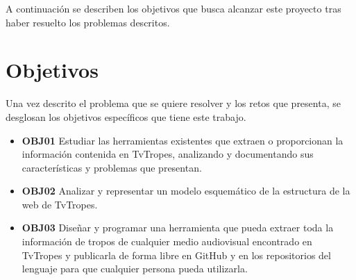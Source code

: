 A continuación se describen los objetivos que busca alcanzar este proyecto tras
haber resuelto los problemas descritos.

\section{Objetivos}

Una vez descrito el problema que se quiere resolver y los retos que presenta, se
desglosan los objetivos específicos que tiene este trabajo.

\begin{itemize}
    \item \textbf{OBJ01} Estudiar las herramientas existentes que extraen o
    proporcionan la información contenida en TvTropes, analizando y documentando
    sus características y problemas que presentan.
    \item \textbf{OBJ02} Analizar y representar un modelo esquemático de la
    estructura de la web de TvTropes.
    \item \textbf{OBJ03} Diseñar y programar una herramienta que pueda extraer
    toda la información de tropos de cualquier medio audiovisual encontrado en
    TvTropes y publicarla de forma libre en GitHub y en los repositorios del
    lenguaje para que cualquier persona pueda utilizarla.
\end{itemize}


